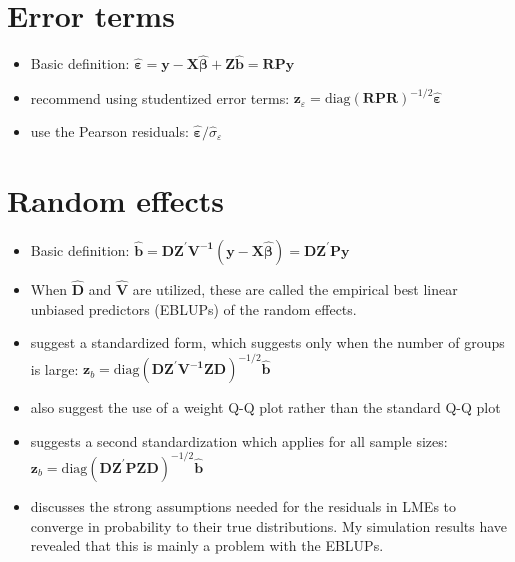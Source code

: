 \documentclass[11pt]{article} %
\begin{document}
\section{Error terms}

\begin{itemize}
\item Basic definition: $\widehat{\bm{\varepsilon}} = \bm{y} - \bm{X \widehat{\beta}} + \bm{Z \widehat{b}} = \bm{R P y}$

\item \cite{Nobre:2007ej} recommend using studentized error terms: 
	$\bm{z}_{\varepsilon} =  \text{diag} \left(\bm{RPR} \right)^{-1/2} \widehat{\bm{\varepsilon}}$
	
\item \citet[Section 4.3]{Pinhiero:2000vf} use the Pearson residuals: $ \widehat{\bm{\varepsilon}} / \widehat{\sigma}_\varepsilon$

\end{itemize}



\section{Random effects}

\begin{itemize}

\item Basic definition: $\widehat{\bm{b}} = \bm{D Z^\prime V^{-1}} \left( \bm{y} - \bm{X \widehat{\beta}} \right) = \bm{D Z^\prime P y}$

\item When $\widehat{\bm{D}}$ and $\widehat{\bm{V}}$ are utilized, these are called the empirical best linear unbiased predictors (EBLUPs) of the random effects.

\item \cite{Lange:1989uu} suggest a standardized form, which \cite{Goldstein:2011} suggests only when the number of groups is large: $\bm{z}_{b} = \text{diag} \left(\bm{DZ^\prime V^{-1} ZD}\right)^{-1/2} \widehat{\bm{b}}$

\item \cite{Lange:1989uu} also suggest the use of a weight Q-Q plot rather than the standard Q-Q plot

\item \cite{Goldstein:2011} suggests a second standardization which applies for all sample sizes: $\bm{z}_{b} = \text{diag} \left(\bm{DZ^\prime P ZD}\right)^{-1/2} \widehat{\bm{b}}
$

\item \citet[Theorem 3.2 and Lemma 3.1]{Jiang:1998vt} discusses the strong assumptions needed for the residuals in LMEs to converge in probability to their true distributions. My simulation results have revealed that this is mainly a problem with the EBLUPs.

\end{itemize}
\end{document}
